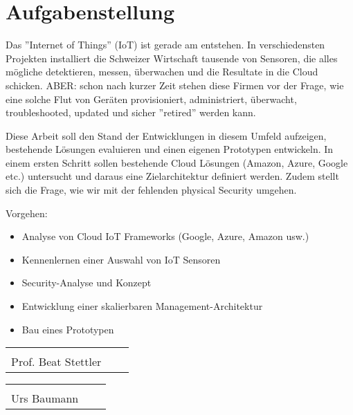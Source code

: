 \chapter*{Aufgabenstellung}
Das ''Internet of Things'' (IoT) ist gerade am entstehen. In verschiedensten Projekten installiert die Schweizer Wirtschaft tausende von Sensoren, die alles mögliche detektieren, messen, überwachen und die Resultate in die Cloud schicken. ABER: schon nach kurzer Zeit stehen diese Firmen vor der Frage, wie eine solche Flut von Geräten provisioniert, administriert, überwacht, troubleshooted, updated und sicher ''retired'' werden kann. 

Diese Arbeit soll den Stand der Entwicklungen in diesem Umfeld aufzeigen, bestehende Lösungen evaluieren und einen eigenen Prototypen entwickeln. In einem ersten Schritt sollen bestehende Cloud Lösungen (Amazon, Azure, Google etc.) untersucht und daraus eine Zielarchitektur definiert werden. Zudem stellt sich die Frage, wie wir mit der fehlenden physical Security umgehen.

Vorgehen:
\begin{itemize}
\item Analyse von Cloud IoT Frameworks (Google, Azure, Amazon usw.)
\item Kennenlernen einer Auswahl von IoT Sensoren
\item Security-Analyse und Konzept
\item Entwicklung einer skalierbaren Management-Architektur
\item Bau eines Prototypen
\end{itemize}



\vspace{1,5 cm} 
\begin{tabular}{p{7cm}p{.5cm}l}
\dotfill \\
Prof. Beat Stettler
\end{tabular}%
\hfill 
\begin{tabular}{p{7cm}p{.5cm}l}
\dotfill \\ 
Urs Baumann
\end{tabular}%